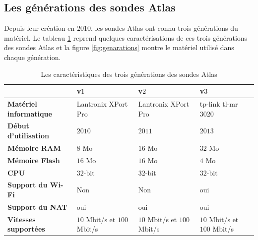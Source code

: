 \subsection{Les générations des sondes  Atlas }

Depuis leur création   en $2010$, les sondes Atlas ont connu   trois générations du matériel. Le tableau   \ref{tab:differents-generations-probes} reprend quelques  caractérisations de ces trois générations des sondes  Atlas et  la figure 	\ref{fig:genarations} montre le matériel utilisé  dans chaque génération.


\begin{table}[H]
	\begin{tabularx}{\textwidth}{|X|X|X|X|}
		\hline
		&\textbf{ v$ 1 $}&\textbf{v$ 2 $}&\textbf{v$ 3 $} \\ \hline
		\textbf{ Matériel informatique}  & Lantronix XPort Pro \cite{LantronixXPortPro} &Lantronix XPort Pro \cite{LantronixXPortPro}&tp-link tl-mr$ 3020  $  \\ \hline
		\textbf{Début d'utilisation}  &$2010$&$2011$&$2013$ \\ \hline
		\textbf{Mémoire RAM} & $8$ Mo&$16$ Mo& $32$ Mo\\ \hline
		\textbf{Mémoire Flash} & $16$ Mo&$16$ Mo&$4$ Mo \\ \hline
		\textbf{CPU} &$ 32 $-bit& $ 32 $-bit & $ 32 $-bit\\ \hline
		\textbf{Support du Wi-Fi} &Non&Non&oui \\ \hline
		\textbf{Support du NAT} &oui&oui&oui \\ \hline
		\textbf{Vitesses supportées} &$ 10 $ Mbit/s et $ 100 $ Mbit/s&$ 10 $ Mbit/s et $ 100 $ Mbit/s&$ 10 $ Mbit/s et $ 100 $ Mbit/s \\ \hline
		
	\end{tabularx}
	\caption{Les caractéristiques des trois générations des sondes  Atlas }
	\label{tab:differents-generations-probes}
\end{table}


